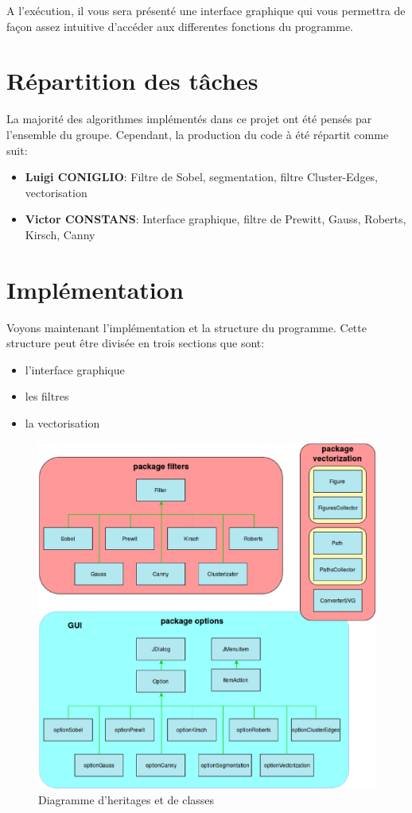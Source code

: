 \documentclass[twoside,openright,a4paper,11pt,french]{article}
\begin{document}
\vspace{1cm}
A l'exécution, il vous sera présenté une interface graphique qui vous
permettra de façon assez intuitive d'accéder aux differentes fonctions
du programme.


\section{Répartition des tâches}
La majorité des algorithmes implémentés dans ce projet ont été pensés par l'ensemble du groupe.
Cependant, la production du code à été répartit comme suit:
\begin{itemize}
\item {\bf Luigi CONIGLIO}: Filtre de Sobel, segmentation, filtre Cluster-Edges, vectorisation
\item {\bf Victor CONSTANS}: Interface graphique, filtre de Prewitt, Gauss, Roberts, Kirsch, Canny
\end{itemize}


\bigbreak

\section{Implémentation}
Voyons maintenant l'implémentation et la structure du programme.
Cette structure peut être divisée en trois sections que sont:
\begin{itemize}
\item l'interface graphique
\item les filtres
\item la vectorisation
\end{itemize}

\begin{figure}[h]
\centering
\includegraphics[width=12cm]{./pics/classes.eps}
\caption{Diagramme d’heritages et de classes}
\end{figure}
\end{document}
